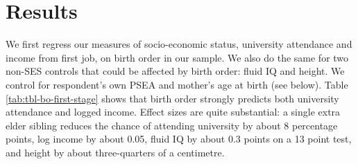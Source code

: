 \documentclass[
]{article}
\begin{document}
\hypertarget{results}{%
\section{Results}\label{results}}

We first regress our measures of socio-economic status, university
attendance and income from first job, on birth order in our sample. We
also do the same for two non-SES controls that could be affected by
birth order: fluid IQ and height. We control for respondent's own PSEA
and mother's age at birth (see below). Table
\ref{tab:tbl-bo-first-stage} shows that birth order strongly predicts
both university attendance and logged income. Effect sizes are quite
substantial: a single extra elder sibling reduces the chance of
attending university by about 8 percentage points, log income by about
0.05, fluid IQ by about 0.3 points on a 13 point test, and height by
about three-quarters of a centimetre.

 
  \providecommand{\huxb}[2]{\arrayrulecolor[RGB]{#1}\global\arrayrulewidth=#2pt}
  \providecommand{\huxvb}[2]{\color[RGB]{#1}\vrule width #2pt}
  \providecommand{\huxtpad}[1]{\rule{0pt}{#1}}
  \providecommand{\huxbpad}[1]{\rule[-#1]{0pt}{#1}}
\end{document}
